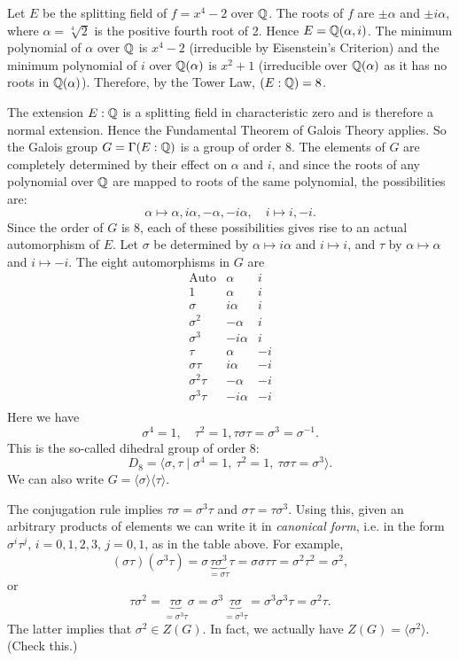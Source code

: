 \begin{example}
	Let $E$ be the splitting field of $f = x^4 - 2$ over $\mathbb{Q}$. The roots of $f$ are $\pm \alpha$ and $\pm i \alpha$, where $\alpha = \sqrt[4]{2}$ is the positive fourth root of 2. Hence $E = \mathbb{Q}(\alpha, i)$. The minimum polynomial of $\alpha$ over $\mathbb{Q}$ is $x^4 - 2$ (irreducible by Eisenstein's Criterion) and the minimum polynomial of $i$ over $\mathbb{Q}(\alpha)$ is $x^2 + 1$ (irreducible over $\mathbb{Q}(\alpha)$ as it has no roots in $\mathbb{Q}(\alpha)$). Therefore, by the Tower Law, $(E : \mathbb{Q}) = 8$.
	
	The extension $E : \mathbb{Q}$ is a splitting field in characteristic zero and is therefore a normal extension. Hence the Fundamental Theorem of Galois Theory applies. So the Galois group $G = \Gamma(E : \mathbb{Q})$ is a group of order 8. The elements of $G$ are completely determined by their effect on $\alpha$ and $i$, and since the roots of any polynomial over $\mathbb{Q}$ are mapped to roots of the same polynomial, the possibilities are:
	\[
		\alpha \mapsto \alpha, i \alpha, -\alpha, -i \alpha, \quad i \mapsto i, -i.
	\]
	Since the order of $G$ is 8, each of these possibilities gives rise to an actual automorphism of $E$. Let $\sigma$ be determined by $\alpha \mapsto i \alpha$ and $i \mapsto i$, and $\tau$ by $\alpha \mapsto \alpha$ and $i \mapsto -i$. The eight automorphisms in $G$ are
	\[
		\begin{array}{c|c|c}
			\text{Auto} & \alpha & i \\
			\hline
			1 & \alpha & i \\
			\sigma & i \alpha & i \\
			\sigma^2 & -\alpha & i \\
			\sigma^3 & -i \alpha & i \\
			\tau & \alpha & -i \\
			\sigma \tau & i \alpha & -i \\
			\sigma^2 \tau & -\alpha & -i \\
			\sigma^3 \tau & -i \alpha & -i \\
		\end{array}
	\]
	Here we have
	\[
		\sigma^4 = 1, \quad \tau^2 = 1, \tau \sigma \tau = \sigma^3 = \sigma^{-1}.
	\]
	This is the so-called dihedral group of order 8:
	\[
		D_8 = \langle \sigma, \tau \mid \sigma^4 = 1,\ \tau^2 = 1,\ \tau \sigma \tau = \sigma^3 \rangle.
	\]
	We can also write $G = \langle \sigma \rangle \langle \tau \rangle$.
	
	The conjugation rule implies $\tau \sigma = \sigma^3 \tau$ and $\sigma \tau = \tau \sigma^3$. Using this, given an arbitrary products of elements we can write it in \emph{canonical form}, i.e. in the form $\sigma^i \tau^j$, $i = 0, 1, 2, 3$, $j = 0, 1$, as in the table above. For example,
	\[
		(\sigma\tau)(\sigma^3 \tau) = \sigma \underbrace{\tau\sigma^3}_{= \sigma\tau} \tau = \sigma\sigma\tau\tau = \sigma^2 \tau^2 = \sigma^2,
	\]
	or
	\[
		\tau\sigma^2 = \underbrace{\tau\sigma}_{= \sigma^3 \tau} \sigma = \sigma^3 \underbrace{\tau\sigma}_{= \sigma^3 \tau} = \sigma^3 \sigma^3 \tau = \sigma^2 \tau.
	\]
	The latter implies that $\sigma^2 \in Z(G)$. In fact, we actually have $Z(G) = \langle \sigma^2 \rangle$. (Check this.)
	

\end{example}
